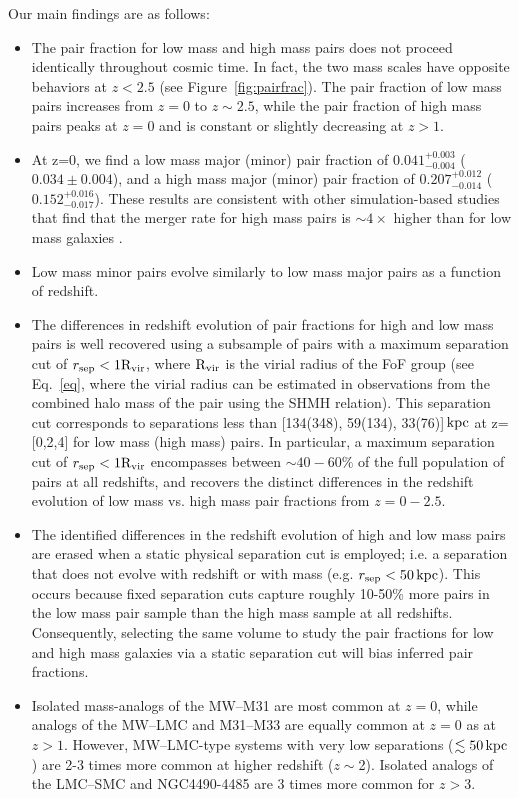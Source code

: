 \documentclass[twocolumn]{aastex631}
\newcommand{\Rvir}{\ensuremath{\rm R_{vir}}}
\begin{document}
Our main findings are as follows:
\begin{itemize}
    \item The pair fraction for low mass and high mass pairs does not proceed identically throughout cosmic time.
    In fact, the two mass scales have opposite behaviors at $z<2.5$ (see Figure~\ref{fig:pairfrac}).
    The pair fraction of low mass pairs increases from $z=0$ to $z\sim2.5$, while the pair fraction of high mass pairs peaks at $z=0$ and is constant or slightly decreasing at $z>1$.
    \item At z=0, we find a low mass major (minor) pair fraction of $0.041^{+0.003}_{-0.004}$ ($0.034\pm0.004$), and a high mass major (minor) pair fraction of $0.207^{+0.012}_{-0.014}$ ($0.152^{+0.016}_{-0.017}$). 
    These results are consistent with other simulation-based studies that find that the merger rate for high mass pairs is $\sim4\times$ higher than for low mass galaxies \citep[e.g.][]{RG2015}. 
    \item Low mass minor pairs evolve similarly to low mass major pairs as a function of redshift.
    \item The differences in redshift evolution of pair fractions for high and low mass pairs is well recovered using a subsample of pairs with a maximum separation cut of $r_{\mathrm{sep}}<1\Rvir$, where $\Rvir$ is the virial radius of the FoF group (see Eq.~\ref{eq}, where the virial radius can be estimated in observations from the combined halo mass of the pair using the SHMH relation).
    This separation cut corresponds to separations less than [134(348), 59(134), 33(76)]$\mathrm{\,kpc}$ at z=[0,2,4] for low mass (high mass) pairs.
    In particular, a maximum separation cut of $r_{\mathrm{sep}}<1\Rvir$ encompasses between $\sim40-60\%$ of the full population of pairs at all redshifts, and recovers the distinct differences in the redshift evolution of low mass vs. high mass pair fractions from $z=0-2.5$. 
    \item The identified differences in the redshift evolution of high and low mass pairs are erased when a static physical separation cut is employed; i.e. a separation that does not evolve with redshift or with mass (e.g. $r_{\mathrm{sep}}<50\mathrm{\,kpc}$). 
    This occurs because fixed separation cuts capture roughly 10-50\% more pairs in the low mass pair sample than the high mass sample at all redshifts.  
    Consequently, selecting the same volume to study the pair fractions for low and high mass galaxies via a static separation cut will bias inferred pair fractions. 
    \item Isolated mass-analogs of the MW--M31 are most common at $z=0$, while analogs of the MW--LMC and M31--M33 are equally common at $z=0$ as at $z>1$. 
    However, MW--LMC-type systems with very low separations ($\lesssim50\mathrm{\,kpc}$) are 2-3 times more common at higher redshift ($z\sim$2). 
    Isolated analogs of the LMC--SMC and  NGC4490-4485 are 3 times more common for $z>3$. 
\end{itemize}
    
\end{document}

